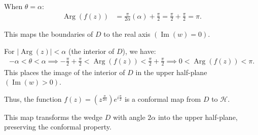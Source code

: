\begin{example}
    When $\theta = \alpha$:
    \begin{align*}
        \operatorname{Arg}(f(z)) & = \frac{\pi}{2\alpha} (\alpha) + \frac{\pi}{2} = \frac{\pi}{2} + \frac{\pi}{2} = \pi.
    \end{align*}

    This maps the boundaries of $D$ to the real axis $(\operatorname{Im}(w) = 0)$.

    For $|\operatorname{Arg}(z)| < \alpha$ (the interior of $D$), we have:
    \begin{align*}
        -\alpha < \theta < \alpha \implies -\frac{\pi}{2} + \frac{\pi}{2} < \operatorname{Arg}(f(z)) < \frac{\pi}{2} + \frac{\pi}{2} \implies 0 < \operatorname{Arg}(f(z)) < \pi.
    \end{align*}
    This places the image of the interior of $D$ in the upper half-plane $(\operatorname{Im}(w) > 0)$.

    Thus, the function $f(z) = \left( z^{\frac{\pi}{2\alpha}} \right) e^{i\frac{\pi}{2}}$ is a conformal map from $D$ to $\mathcal{H}$.

    This map transforms the wedge $D$ with angle $2\alpha$ into the upper half-plane, preserving the conformal property.

\end{example}

